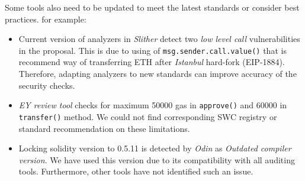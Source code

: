 Some tools also need to be updated to meet the latest standards or consider best practices. for example:
\begin{itemize}
	\item Current version of analyzers\cite{SlitherSetup} in \textit{Slither} detect two \textit{low level call} vulnerabilities in the proposal. This is due to using of \texttt{msg.sender.call.value()} that is recommend way of transferring ETH after \textit{Istanbul} hard-fork (EIP-1884).	Therefore, adapting analyzers to new standards can improve accuracy of the security checks.
	\item \textit{EY review tool} checks for maximum 50000 gas in \texttt{approve()} and 60000 in \texttt{transfer()} method. We could not find corresponding SWC registry or standard recommendation on these limitations.
	\item Locking solidity version to 0.5.11 is detected by \textit{Odin} as \textit{Outdated compiler version}. We have used this version due to its compatibility with all auditing tools. Furthermore, other tools have not identified such an issue.
\end{itemize}
